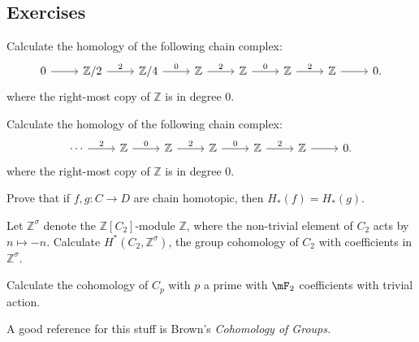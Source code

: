 \subsection{Exercises}

\begin{exercise}{}{}
    Calculate the homology of the following chain complex:
    \[ \begin{tikzcd} 
     0 \ar[r] & \mathbb{Z}/2  \ar[r,"2"] & \mathbb{Z}/4 \ar[r,"0"] & \mathbb{Z} \ar[r,"2"] & \mathbb{Z} \ar[r,"0"] & \mathbb{Z} \ar[r,"2"] & \mathbb{Z} \ar[r] & 0.
    \end{tikzcd} \]
    where the right-most copy of $\mathbb{Z}$ is in degree $0$. 
\end{exercise}
\begin{exercise}{}{}
    Calculate the homology of the following chain complex:
    \[ \begin{tikzcd} 
    \cdots \ar[r,"2"] & \mathbb{Z} \ar[r,"0"] & \mathbb{Z} \ar[r,"2"] & \mathbb{Z} \ar[r,"0"] & \mathbb{Z} \ar[r,"2"] & \mathbb{Z} \ar[r] & 0.
    \end{tikzcd} \]
    where the right-most copy of $\mathbb{Z}$ is in degree $0$. 
\end{exercise}
\begin{exercise}{}{}
    Prove that if $f,g:C \to D$ are chain homotopic, then $H_*(f) = H_*(g)$.
\end{exercise}
\begin{exercise}{}{}
    Let $\mathbb{Z}^\sigma$ denote the $\mathbb{Z}[C_2]$-module $\mathbb{Z}$, where the non-trivial element of $C_2$ acts by $n \mapsto -n$. Calculate $H^*(C_2,\mathbb{Z}^\sigma)$, the group cohomology of $C_2$ with coefficients in $\mathbb{Z}^\sigma$.

\end{exercise}
\begin{exercise}{}{}
    Calculate the cohomology of $C_p$ with $p$ a prime with $\mF_2$ coefficients with trivial action. 

    A good reference for this stuff is Brown's \emph{Cohomology of Groups. }
\end{exercise}